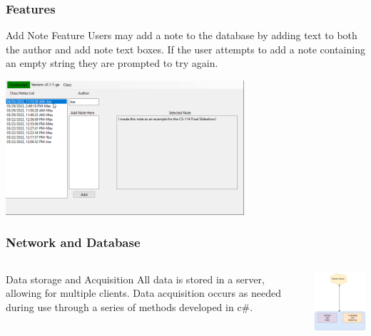 \documentclass[aspectratio=169]{beamer}
\begin{document}
\begin{frame}
    \frametitle{Features}

    \begin{block}{\centering Add Note Feature}
        \centering Users may add a note to the database by adding text to both the author and add note text boxes. If the user attempts to add a note containing an empty string they are prompted to try again.
    \end{block}

    \centering \includegraphics[height=5cm]{created.png}
\end{frame}

\begin{frame}
    \frametitle{Network and Database}

    \begin{columns}
        \begin{column}{0.48\textwidth}
            \begin{block}{Data storage and Acquisition}
                All data is stored in a server, allowing for multiple clients. Data acquisition occurs as needed during use through a series of methods developed in c\#.
            \end{block}
        \end{column}
        \begin{column}{0.48\textwidth}
            \includegraphics[width=5cm]{Simple Diagram.png}
        \end{column}
    \end{columns}
\end{frame}
\end{document}
